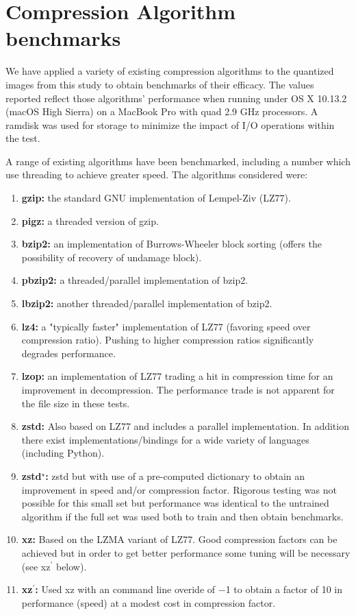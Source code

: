 \clearpage

\section{Compression Algorithm benchmarks}

We have applied a variety of existing compression algorithms to the quantized images from this study to 
obtain benchmarks of their efficacy.  The values reported reflect those algorithms' performance when
running under OS X 10.13.2 (macOS High Sierra) on a MacBook Pro with quad 2.9 GHz processors.  A ramdisk
was used for storage to minimize the impact of I/O operations within the test.  

A range of existing algorithms have been benchmarked, including a number which use threading to achieve 
greater speed.  The algorithms considered were:
\begin{enumerate}
\item {\bf gzip:} the standard GNU implementation of Lempel-Ziv (LZ77).
\item {\bf pigz:} a threaded version of gzip.
\item {\bf bzip2:} an implementation of Burrows-Wheeler block sorting (offers the possibility of recovery of undamage block).
\item {\bf pbzip2:} a threaded/parallel implementation of bzip2.
\item {\bf lbzip2:} another threaded/parallel implementation of bzip2.
\item {\bf lz4:} a "typically faster" implementation of LZ77 (favoring speed over compression ratio). Pushing to higher compression ratios significantly degrades performance.
\item {\bf lzop:} an implementation of LZ77 trading a hit in compression time for an improvement in decompression.  
The performance trade is not apparent for the file size in these tests.
\item {\bf zstd:} Also based on LZ77 and includes a parallel implementation.  In addition there
exist implementations/bindings for a wide variety of languages (including Python).  
\item {\bf zstd$^\star$:} zstd but with use of a pre-computed dictionary to obtain an improvement
in speed and/or compression factor.  Rigorous testing was not possible for this small set but performance
was identical to the untrained algorithm if the full set was used both to train and then obtain benchmarks.
\item {\bf xz:} Based on the LZMA variant of LZ77.  Good compression factors can be achieved 
but in order to get better performance some tuning will be necessary (see xz$^\prime$ below).
\item {\bf xz$^\prime$:} Used xz with an command line overide of $-$1 to obtain a factor of 10 in performance (speed)
at a modest cost in compression factor. 
\end{enumerate}

